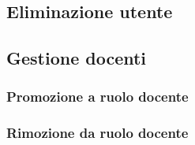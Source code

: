 \documentclass[12pt,a4paper]{article}
\begin{document}
		\subsection{Eliminazione utente}
		\subsection{Gestione docenti}
			\subsubsection{Promozione a ruolo docente}
			\subsubsection{Rimozione da ruolo docente}
	
	


	
\end{document}
